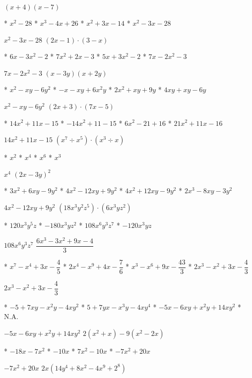 $(x+4)(x-7)$
\begin{enum}
	* $x^2-28$
	* $x^3-4x+26$
	* $x^2+3x-14$
	* $x^2-3x-28$
\end{enum}
$x^2-3x-28$
$(2x-1)\cdot(3-x)$
\begin{enum}
	* $6x-3x^2-2$
	* $7x^2+2x-3$
	* $5x+3x^2-2$
	* $7x-2x^2-3$
\end{enum}
$7x-2x^2-3$
$(x-3y)(x+2y)$
\begin{enum}
	* $x^2-xy-6y^2$
	* $-x-xy+6x^2y$
	* $2x^2+xy+9y$
	* $4xy+xy-6y$
\end{enum}
$x^2-xy-6y^2$
$(2x+3)\cdot(7x-5)$
\begin{enum}
	* $14x^2+11x-15$
	* $-14x^2+11-15$
	* $6x^2-21+16$
	* $21x^2+11x-16$
\end{enum}
$14x^2+11x-15$
$\left(x^7\div x^5\right)\cdot\left(x^3\div x\right)$
\begin{enum}
	* $x^2$
	* $x^4$
	* $x^6$
	* $x^3$
\end{enum}
$x^4$
$(2x-3y)^2$
\begin{enum}
	* $3x^2+6xy-9y^2$
	* $4x^2-12xy+9y^2$
	* $4x^2+12xy-9y^2$
	* $2x^3-8xy-3y^2$
\end{enum}
$4x^2-12xy+9y^2$
$\left(18x^3y^2z^5\right)\cdot\left(6x^3yz^2\right)$
\begin{enum}
	* $120x^3y^5z$
	* $-180x^3yz^2$
	* $108x^6y^3z^7$
	* $-120x^3yz$
\end{enum}
$108x^6y^3z^7$
$\dfrac{6x^3-3x^2+9x-4}{3}$
\begin{enum}
	* $x^7-x^4+3x-\dfrac{4}{5}$
	* $2x^4-x^9+4x-\dfrac{7}{6}$
	* $x^3-x^6+9x-\dfrac{43}{3}$
	* $2x^3-x^2+3x-\dfrac{4}{3}$
\end{enum}
$2x^3-x^2+3x-\dfrac{4}{3}$
\begin{enum}
	* $-5+7xy-x^2y-4xy^2$
	* $5+7yx-x^3y-4xy^4$
	* $-5x-6xy+x^2y+14xy^2$
	* N.A.
\end{enum}
$-5x-6xy+x^2y+14xy^2$
$2\left(x^2+x\right)-9\left(x^2-2x\right)$
\begin{enum}
	* $-18x-7x^2$
	* $-10x$
	* $7x^2-10x$
	* $-7x^2+20x$
\end{enum}
$-7x^2+20x$
$2x\left(14y^4+8x^2-4x^9+2^8\right)$
